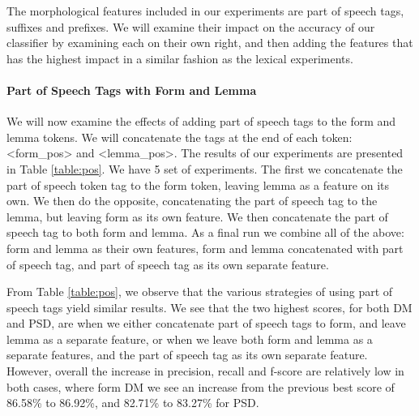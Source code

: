 The morphological features included in our experiments are part of speech tags, suffixes and prefixes. We will examine their impact on the accuracy of our classifier by examining each on their own right, and then adding the features that has the highest impact in a similar fashion as the lexical experiments. 


\paragraph{Part of Speech Tags with Form and Lemma} We will now examine the effects of adding part of speech tags to the form and lemma tokens. We will concatenate the tags at the end of each token: <form\_pos> and <lemma\_pos>. The results of our experiments are presented in Table \ref{table:pos}. We have 5 set of experiments. The first we concatenate the part of speech token tag to the form token, leaving lemma as a feature on its own. We then do the opposite, concatenating the part of speech tag to the lemma, but leaving form as its own feature. We then concatenate the part of speech tag to both form and lemma. As a final run we combine all of the above: form and lemma as their own features, form and lemma concatenated with part of speech tag, and part of speech tag as its own separate feature. 

From Table \ref{table:pos}, we observe that the various strategies of using part of speech tags yield similar results. We see that the two highest scores, for both DM and PSD, are when we either concatenate part of speech tags to form, and leave lemma as a separate feature, or when we leave both form and lemma as a separate features, and the part of speech tag as its own separate feature. However, overall the increase in precision, recall and f-score are relatively low in both cases, where form DM we see an increase from the previous best score of 86.58\% to 86.92\%, and 82.71\% to 83.27\% for PSD.

